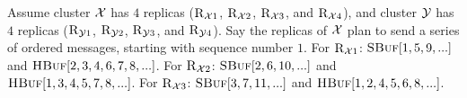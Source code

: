 \begin{example}\label{ex:rep-send}
Assume cluster $\mathcal{X}$ has $4$ replicas ($\textsc{R}_{{\mathcal{X}}{1}}$, $\textsc{R}_{{\mathcal{X}}{2}}$, $\textsc{R}_{{\mathcal{X}}{3}}$, and $\textsc{R}_{{\mathcal{X}}{4}}$), 
and 
cluster $\mathcal{Y}$ has $4$ replicas ($\textsc{R}_{{\mathcal{Y}}{1}}$, $\textsc{R}_{{\mathcal{Y}}{2}}$, $\textsc{R}_{{\mathcal{Y}}{3}}$, and $\textsc{R}_{{\mathcal{Y}}{4}}$).
Say the replicas of $\mathcal{X}$ plan to send a series of ordered messages, starting with sequence number $1$. 
For $\textsc{R}_{{\mathcal{X}}{1}}$: $\textsc{SBuf}[{1,5,9,...}]$ and $\textsc{HBuf}[{2,3,4,6,7,8,...}]$. 
For $\textsc{R}_{{\mathcal{X}}{2}}$: $\textsc{SBuf}[{2,6,10,...}]$ and $\textsc{HBuf}[{1,3,4,5,7,8,...}]$.
For $\textsc{R}_{{\mathcal{X}}{3}}$: $\textsc{SBuf}[{3,7,11,...}]$ and $\textsc{HBuf}[{1,2,4,5,6,8,...}]$.
\end{example}




